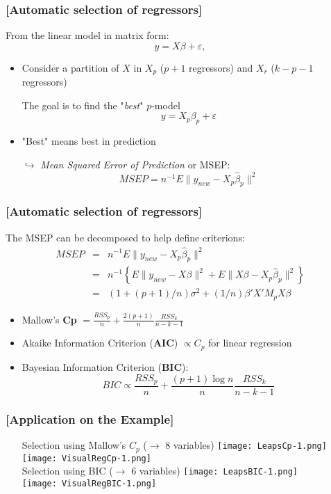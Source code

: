 \documentclass[xcolor=x11names,compress]{beamer}
\renewcommand{\(}{\begin{columns}}
\renewcommand{\)}{\end{columns}}
\newcommand{\<}[1]{\begin{column}{#1}}
\renewcommand{\>}{\end{column}}
\begin{document}
\begin{frame} %
\frametitle{\textcolor{brique}{[Automatic selection of regressors]}}
From the linear model in matrix form:
$$
 y = X \beta + \varepsilon,
$$
\pause
\begin{itemize}[<+->]
  \item Consider  a partition of $X$ in $X_p$ ($p+1$ regressors) and $X_r$ ($k-p-1$ regressors)
  \item[] The goal is to find the "\textit{best}" $p$-model
      $$
      y = X_p \beta_p + \varepsilon
      $$
  \item "Best" means  best in prediction
  \item[$\hookrightarrow$] \emph{Mean Squared Error of Prediction} or MSEP:
  $$
    MSEP = n^{-1} E \| y_{new} - X_p\widehat{\beta}_p\|^2
  $$
\end{itemize}
\end{frame}


\begin{frame} %
\frametitle{\textcolor{brique}{[Automatic selection of regressors]}}

The MSEP can be decomposed to help define criterions:
\begin{eqnarray*}
MSEP &=& n^{-1} E \| y_{new} - X_p\widehat{\beta}_p\|^2   \\
    &=& n^{-1} \left\{ E \| y_{new} - X{\beta}\|^2 + E \| X{\beta} - X_p\widehat{\beta}_p\|^2  \right\}\\
    &=& (1+(p+1)/n) \sigma^{2} + (1/n) \beta'X' M_p X\beta
\end{eqnarray*}
\pause
\begin{itemize}[<+->]
  \item Mallow's \textbf{Cp}  $ = \frac{RSS_p}{n}  + \frac{2(p+1)}{n} \frac{RSS_k}{n-k-1} $
  \item Akaike Information Criterion (\textbf{AIC})  $\propto C_p$ for linear regression
  \item Bayesian  Information Criterion (\textbf{BIC}): $$ BIC \propto \frac{RSS_p}{n}  + \frac{(p+1) \log n}{n} \frac{RSS_k}{n-k-1} $$
\end{itemize}
\end{frame}

\begin{frame} %
\frametitle{\textcolor{brique}{[Application on the Example]}}
\pause
\begin{itemize}
  \item[]
   {Selection using Mallow's $C_p$ ($\rightarrow $ 8 variables) }
   { \texttt{[image: LeapsCp-1.png]} \\ }
   { \texttt{[image: VisualRegCp-1.png]} \\ }
   {Selection using BIC ($\rightarrow $ 6 variables) }
   { \texttt{[image: LeapsBIC-1.png]} \\ }
   { \texttt{[image: VisualRegBIC-1.png]} \\ }
\end{itemize}
\end{frame}
\end{document}
